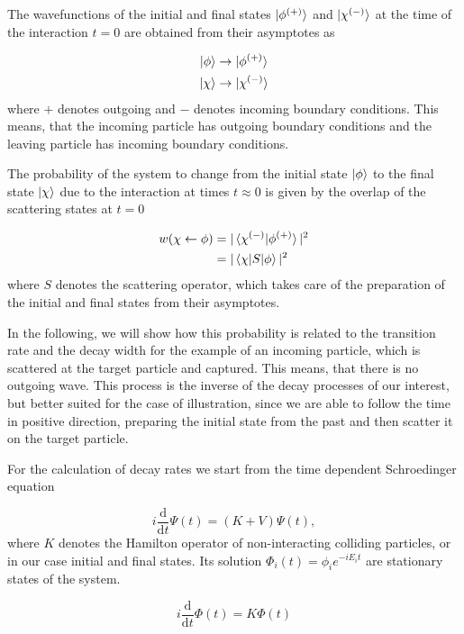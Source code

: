 The wavefunctions of the initial and final states $\ket{\phi ^{(+)}}$
and $\ket{\chi ^{(-)}}$
at the time of the interaction
$t=0$ are obtained from their asymptotes as

\begin{align}
  \ket{\phi}  &\rightarrow  \ket{\phi ^{(+)}}\\
  \ket{\chi}  &\rightarrow  \ket{\chi ^{(-)}}
\end{align}
where $+$ denotes outgoing and $-$ denotes incoming boundary conditions.
This means, that the incoming particle has outgoing boundary conditions and the
leaving particle has incoming boundary conditions.

The probability of the system to change from the initial state $\ket{\phi}$ to
the final state $\ket{\chi}$ due to the interaction at times $t\approx 0$ is given
by the overlap of the scattering states at $t=0$

\begin{align}
  w(\chi \leftarrow \phi) &= | \braket{\chi^{(-)}|\phi^{(+)}} |^2   \\
                          &= | \braket{\chi|S|\phi} | ^2
\end{align}
where $S$ denotes the scattering operator, which takes care of the preparation
of the initial and final states from their asymptotes.

In the following, we will show how this probability is related to the transition
rate and the decay width for the example of an incoming particle, which is scattered
at the target particle and captured. This means, that there is no outgoing wave.
This process is the inverse of the decay processes of our interest, but better
suited for the case of illustration, since we are able to follow the time in positive
direction, preparing the initial state from the past and then scatter it on the
target particle.

For the calculation of decay rates we start
from the time dependent Schroedinger equation

\begin{equation}
  i \frac{\mathrm{d}}{\mathrm{d}t} \Psi(t) = (K + V) \Psi(t) ,
\end{equation}
where $K$ denotes the Hamilton operator of non-interacting colliding
particles, or in our case initial and final states. Its solution
$\Phi_i(t) = \phi_i e^{-iE_it}$ are stationary states of the system.

\begin{equation}
  i \frac{\mathrm{d}}{\mathrm{d}t} \Phi(t) = K \Phi(t)
\end{equation}

